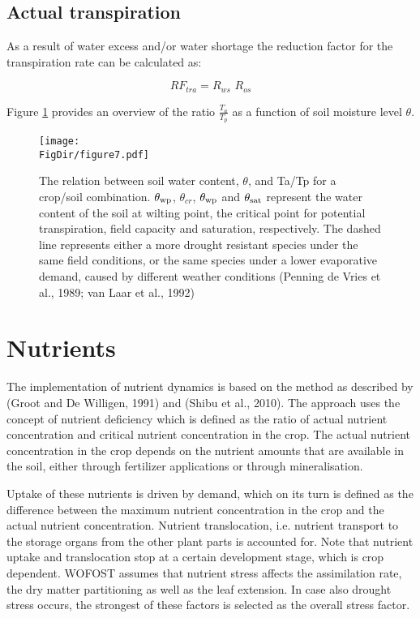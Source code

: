 \subsection{Actual transpiration}
As a result of water excess and/or water shortage the reduction factor for the transpiration rate can be
calculated as:

\begin{equation}
\label{eq:6.14}
RF_{tra} = R_{ws} \,\, R_{os}
\end{equation}

Figure \ref{fig:TaTp_vs_soilmoisture} provides an overview of the ratio $\frac{T_a}{T_p}$ as
a function of soil moisture level $\theta$. 


\begin{figure}[p]
	\centering
	\texttt{[image: \\FigDir/figure7.pdf]}
	\caption{The relation between soil water content, $\theta$, and Ta/Tp for a crop/soil combination. 
		$\theta_{{\rm wp}}$, $\theta_{cr}$, $\theta_{{\rm wp}}$ and $\theta_{{\rm sat}}$ represent the water
		 content of the soil at wilting point, the critical point for potential transpiration, field capacity 
		 and saturation, respectively. The dashed line represents either a more drought resistant species under
		 the same field conditions, or the same species under a lower evaporative demand, caused by different
		 weather conditions (Penning de Vries et al., 1989; van Laar et al., 1992)}
	\label{fig:TaTp_vs_soilmoisture}
\end{figure}

\section{Nutrients}

The implementation of nutrient dynamics is based on the method as described by (Groot and De Willigen, 1991) 
and (Shibu et al., 2010). The approach uses the concept of nutrient deficiency which is defined as the ratio 
of actual nutrient concentration and critical nutrient concentration in the crop. The actual nutrient 
concentration in the crop depends on the nutrient amounts that are available in the soil, either through 
fertilizer applications or through mineralisation. 

Uptake of these nutrients is driven by demand, which on its turn is defined as the difference between the 
maximum nutrient concentration in the crop and the actual nutrient concentration. Nutrient translocation, 
i.e. nutrient transport to the storage organs from the other plant parts is accounted for. Note that nutrient 
uptake and translocation stop at a certain development stage, which is crop dependent. WOFOST assumes
that nutrient stress affects the assimilation rate, the dry matter partitioning as well as the leaf extension. 
In case also drought stress occurs, the strongest of these factors is selected as the overall stress factor.


